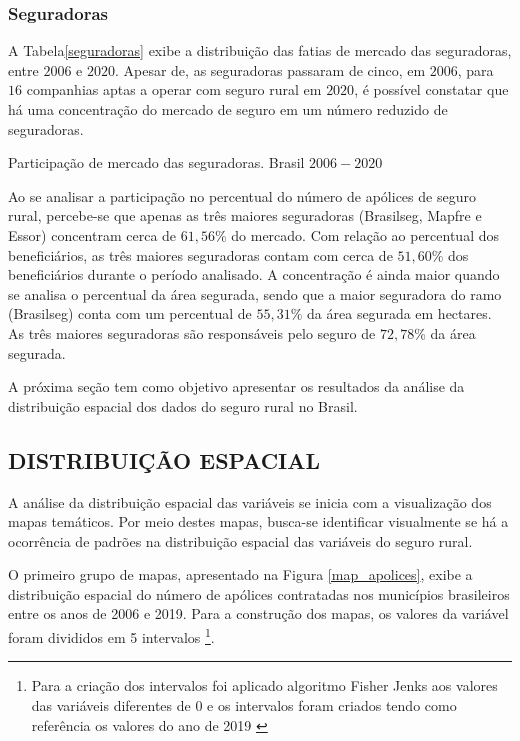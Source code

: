 \subsubsection{Seguradoras}

A Tabela\ref{seguradoras} exibe a distribuição das fatias de mercado das seguradoras, entre $2006$ e $2020$. Apesar de, as seguradoras passaram de cinco, em $2006$, para $16$ companhias aptas a operar com seguro rural em $2020$, é possível constatar que há uma concentração do mercado de seguro em um número reduzido de seguradoras. 

\begin{small}
\begin{table}[H]
\caption{Participação de mercado das seguradoras. Brasil $2006-2020$}\label{seguradoras}
 
\end{table}
\end{small}

Ao se analisar a participação no percentual do número de apólices de seguro rural, percebe-se que apenas as três maiores seguradoras (Brasilseg, Mapfre e Essor) concentram cerca de $61,56\%$ do mercado. Com relação ao percentual dos beneficiários, as três maiores seguradoras contam com cerca de $51,60\%$ dos beneficiários durante o período analisado. A concentração é ainda maior quando se analisa o percentual da área segurada, sendo que a  maior seguradora do ramo (Brasilseg) conta com um percentual de $55,31\%$ da área segurada em hectares. As três maiores seguradoras são responsáveis pelo seguro de $72,78\%$ da área segurada. 

A próxima seção tem como objetivo apresentar os resultados da análise da distribuição espacial dos dados do seguro rural no Brasil. 

\subsection{DISTRIBUIÇÃO ESPACIAL}

A análise da distribuição espacial das variáveis se inicia com a visualização dos mapas temáticos. Por meio destes mapas, busca-se identificar visualmente se há a ocorrência de padrões na distribuição espacial das variáveis do seguro rural.

O primeiro grupo de mapas, apresentado na Figura \ref{map_apolices}, exibe a distribuição espacial do número de apólices contratadas nos municípios brasileiros entre os anos de 2006 e 2019. Para a construção dos mapas, os valores da variável foram divididos em 5 intervalos \footnote{Para a criação dos intervalos foi aplicado algoritmo Fisher Jenks aos valores das variáveis diferentes de $0$ e os intervalos foram criados tendo como referência os valores do ano de 2019 \cite{jenks77}}.

